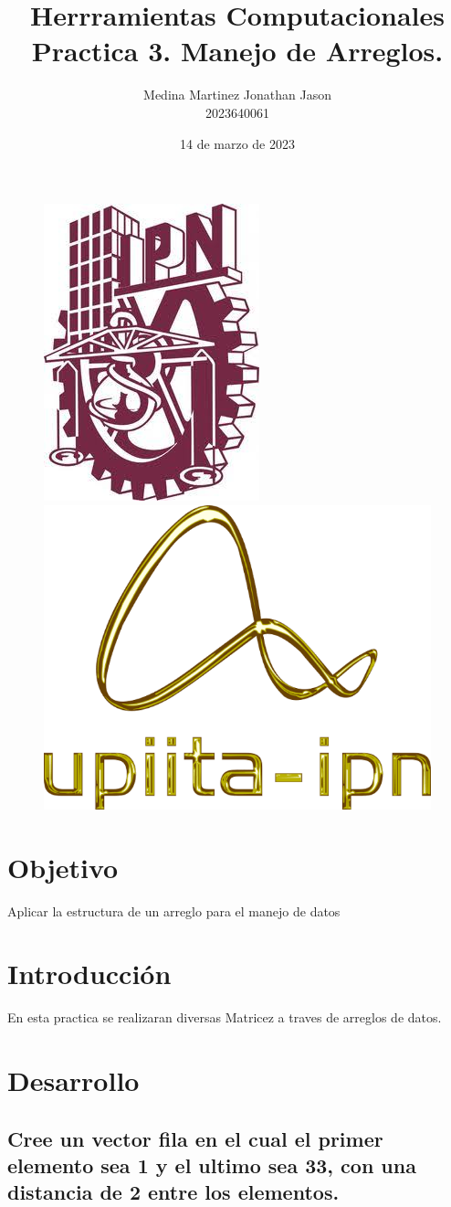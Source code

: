 \documentclass{article}
\title{Herrramientas Computacionales \\ Practica 3. Manejo de Arreglos.}
\author{Medina Martinez Jonathan Jason \\ 2023640061}
\date{14 de marzo de 2023}
\begin{document}

\fontsize{12}{14}\selectfont

\begin{figure}[t] %

\includegraphics[width=2.5 cm]{Logo1.jpeg}
\hfill
\includegraphics[width=3 cm]{Logo2.png}

\end{figure}

\maketitle %
\newpage

\tableofcontents %
\newpage

\section{Objetivo}

Aplicar la estructura de un arreglo para el manejo de datos

\section{Introducción}

En esta practica se realizaran diversas Matricez a traves de arreglos de datos.

\newpage

\section{Desarrollo}

\subsection{Cree un vector fila en el cual el primer elemento sea 1 y el ultimo sea 33, con una distancia de 2 entre los elementos.}
\end{document}
